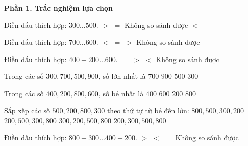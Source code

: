 \textbf{Phần 1. Trắc nghiệm lựa chọn}

\begin{ex} %
Điền dấu thích hợp: $300 \dots 500$.
\choice
{$>$}
{$=$}
{Không so sánh được}
{\True $<$}
\end{ex}

\begin{ex} %
Điền dấu thích hợp: $700 \dots 600$.
\choice
{$<$}
{$=$}
{\True $>$}
{Không so sánh được}
\end{ex}

\begin{ex} %
Điền dấu thích hợp: $400 + 200 \dots 600$.
\choice
{\True $=$}
{$>$}
{$<$}
{Không so sánh được}
\end{ex}

\begin{ex} %
Trong các số $300, 700, 500, 900$, số lớn nhất là
\choice
{$700$}
{\True $900$}
{$500$}
{$300$}
\end{ex}

\begin{ex} %
Trong các số $400, 200, 800, 600$, số bé nhất là
\choice
{$400$}
{$600$}
{\True $200$}
{$800$}
\end{ex}

\begin{ex} %
Sắp xếp các số $500, 200, 800, 300$ theo thứ tự từ bé đến lớn:
\choice
{$800, 500, 300, 200$}
{$200, 500, 300, 800$}
{$300, 200, 500, 800$}
{\True $200, 300, 500, 800$}
\end{ex}

\begin{ex} %
Điền dấu thích hợp: $800 - 300 \dots 400 + 200$.
\choice
{$>$}
{\True $<$}
{$=$}
{Không so sánh được}
\end{ex}

